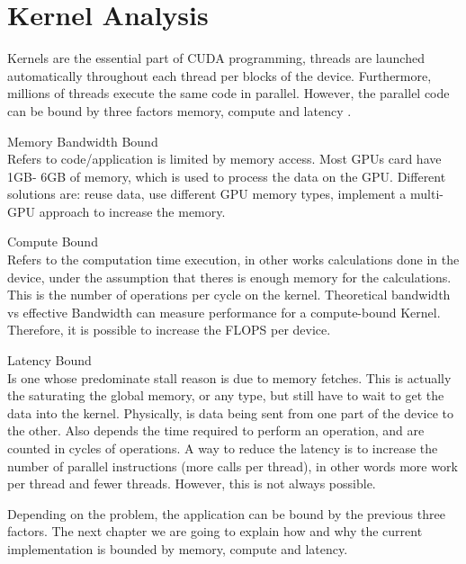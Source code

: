 \section{Kernel Analysis}

 Kernels are the essential part of CUDA programming, threads are launched automatically throughout each thread per blocks of the device. Furthermore, millions of threads execute the same code in parallel. However, the parallel code can be bound by three factors memory, compute and latency \cite{cook}.

\begin{description}

 \item{Memory Bandwidth Bound} \hfill \\
  Refers to code/application is limited by memory access. Most GPUs card have 1GB- 6GB of memory, which is used to process the data on the GPU. Different solutions are: reuse data, use different GPU memory types, implement a multi-GPU approach to increase the memory.

  \item{Compute Bound} \hfill \\
Refers to the computation time execution, in other works calculations done in the device, under the assumption that theres is enough memory for the calculations. This is the number of operations per cycle on the kernel. Theoretical bandwidth vs effective Bandwidth can measure performance for a compute-bound Kernel. Therefore, it is possible to increase the FLOPS per device.

 \item{Latency Bound} \hfill \\
 Is one whose predominate stall reason is due to memory fetches. This is actually the saturating the global memory, or any type, but still have to wait to get the data into the kernel. Physically, is data being sent from one part of the device to the other. Also depends the time required to perform an operation, and are counted in cycles of operations. A way to reduce the latency is to increase the number of parallel instructions (more  calls per thread), in other words more work per thread and fewer threads. However, this is not always possible.
 \end{description}
 
Depending on the problem, the application can be bound by the previous three factors. The next chapter we are going to explain how and why the current implementation is bounded by memory, compute and latency.


